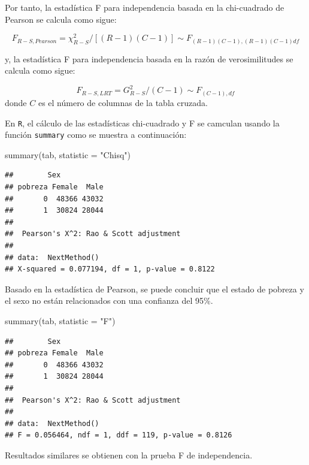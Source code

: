 \documentclass[
  12pt,
]{book}
\newenvironment{Shaded}{\begin{snugshade}}{\end{snugshade}}
\newcommand{\AttributeTok}[1]{\textcolor[rgb]{0.77,0.63,0.00}{#1}}
\newcommand{\FunctionTok}[1]{\textcolor[rgb]{0.00,0.00,0.00}{#1}}
\newcommand{\NormalTok}[1]{#1}
\newcommand{\StringTok}[1]{\textcolor[rgb]{0.31,0.60,0.02}{#1}}
\begin{document}
Por tanto, la estadística F para independencia basada en la chi-cuadrado de Pearson se calcula como sigue:

\[
F_{R-S,Pearson}=\chi_{R-S}^{2}\big/\left[\left(R-1\right)\left(C-1\right)\right]\sim F_{\left(R-1\right)\left(C-1\right),\left(R-1\right)\left(C-1\right)df}
\]

y, la estadística F para independencia basada en la razón de verosimilitudes se calcula como sigue:

\[
F_{R-S,LRT}=G_{R-S}^{2}\big/\left(C-1\right)\sim F_{\left(C-1\right),df}
\]
donde \(C\) es el número de columnas de la tabla cruzada.

En \texttt{R}, el cálculo de las estadísticas chi-cuadrado y F se camculan usando la función \texttt{summary} como se muestra a continuación:

\begin{Shaded}
\begin{Highlighting}[]
\FunctionTok{summary}\NormalTok{(tab, }\AttributeTok{statistic =} \StringTok{"Chisq"}\NormalTok{)}
\end{Highlighting}
\end{Shaded}

\begin{verbatim}
##        Sex
## pobreza Female  Male
##       0  48366 43032
##       1  30824 28044
## 
##  Pearson's X^2: Rao & Scott adjustment
## 
## data:  NextMethod()
## X-squared = 0.077194, df = 1, p-value = 0.8122
\end{verbatim}

Basado en la estadística de Pearson, se puede concluir que el estado de pobreza y el sexo no están relacionados con una confianza del 95\%.

\begin{Shaded}
\begin{Highlighting}[]
\FunctionTok{summary}\NormalTok{(tab, }\AttributeTok{statistic =} \StringTok{"F"}\NormalTok{)}
\end{Highlighting}
\end{Shaded}

\begin{verbatim}
##        Sex
## pobreza Female  Male
##       0  48366 43032
##       1  30824 28044
## 
##  Pearson's X^2: Rao & Scott adjustment
## 
## data:  NextMethod()
## F = 0.056464, ndf = 1, ddf = 119, p-value = 0.8126
\end{verbatim}

Resultados similares se obtienen con la prueba F de independencia.
\end{document}
